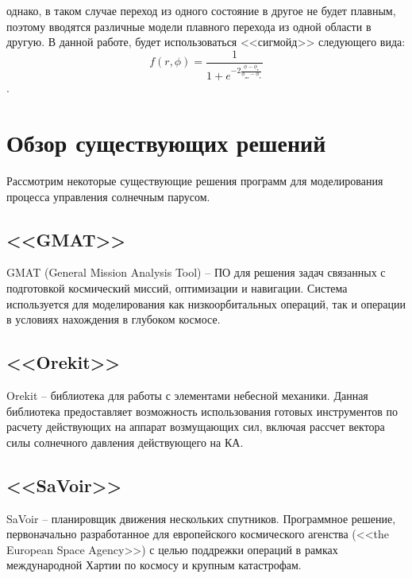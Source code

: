 однако, в таком случае переход из одного состояние в другое не будет плавным, поэтому
вводятся различные модели плавного перехода из одной области в другую. В данной работе,
будет использоваться <<сигмойд>> следующего вида:
\begin{equation}
  f(r, \phi) = \frac{1}{1 + e^{-2\frac{\phi - \phi_{\text{т}}}{\phi_{\text{пт}} - \phi_{\text{т}}}}}
\end{equation}.
\section{Обзор существующих решений}
\noindent\indent Рассмотрим некоторые существующие решения программ для моделирования
процесса управления солнечным парусом.
\subsection{<<GMAT>>}
\noindent\indent GMAT (General Mission Analysis Tool) -- ПО для решения задач связанных
с подготовкой космический миссий, оптимизации и навигации. Система используется для
моделирования как низкоорбитальных операций, так и операции в условиях нахождения
в глубоком космосе.
\subsection{<<Orekit>>}
\noindent\indent Orekit -- библиотека для работы с элементами небесной механики.
Данная библиотека предоставляет возможность использования готовых инструментов по расчету
действующих на аппарат возмущающих сил, включая рассчет вектора силы солнечного давления
действующего на КА.
\subsection{<<SaVoir>>}
\noindent\indent SaVoir -- планировщик движения нескольких спутников. Программное
решение, первоначально разработанное для европейского космического агенства
(<<the European Space Agency>>) с целью поддрежки операций в рамках международной
Хартии по космосу и крупным катастрофам.
